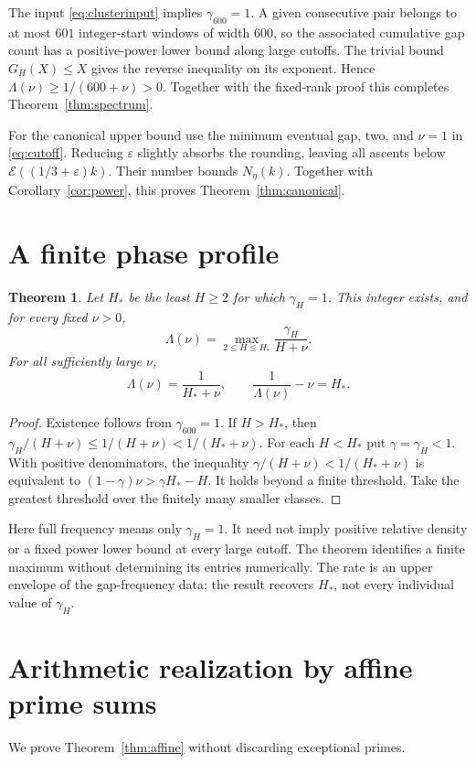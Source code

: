 \documentclass[11pt]{article}
\newtheorem{theorem}{Theorem}[section]
\theoremstyle{definition}
\newcommand{\EE}{\mathcal E}
\begin{document}
The input \eqref{eq:clusterinput} implies $\gamma_{600}=1$.
A given consecutive pair belongs to at most $601$ integer-start
windows of width $600$, so the associated cumulative gap count
has a positive-power lower bound along large cutoffs.
The trivial bound $G_H(X)\le X$ gives the reverse inequality
on its exponent. Hence $\Lambda(\nu)\ge1/(600+\nu)>0$.
Together with the fixed-rank proof this completes
Theorem~\ref{thm:spectrum}.

For the canonical upper bound use the minimum eventual gap,
two, and $\nu=1$ in \eqref{eq:cutoff}. Reducing $\varepsilon$
slightly absorbs the rounding, leaving all ascents below
$\EE((1/3+\varepsilon)k)$. Their number bounds $N_\eta(k)$.
Together with Corollary~\ref{cor:power}, this proves
Theorem~\ref{thm:canonical}.

\section{A finite phase profile}\label{sec:phase}
\begin{theorem}\label{thm:phase}
Let $H_*$ be the least $H\ge2$ for which $\gamma_H=1$.
This integer exists, and for every fixed $\nu>0$,
\[
 \Lambda(\nu)=\max_{2\le H\le H_*}\frac{\gamma_H}{H+\nu}.
\]
For all sufficiently large $\nu$,
\begin{equation}\label{eq:recovery}
 \Lambda(\nu)=\frac1{H_*+\nu},\qquad
 \frac1{\Lambda(\nu)}-\nu=H_*.
\end{equation}
\end{theorem}
\begin{proof}
Existence follows from $\gamma_{600}=1$.
If $H>H_*$, then
$\gamma_H/(H+\nu)\le1/(H+\nu)<1/(H_*+\nu)$.
For each $H<H_*$ put $\gamma=\gamma_H<1$.
With positive denominators, the inequality
$\gamma/(H+\nu)<1/(H_*+\nu)$ is equivalent to
$(1-\gamma)\nu>\gamma H_*-H$.
It holds beyond a finite threshold. Take the greatest threshold
over the finitely many smaller classes.
\end{proof}
Here full frequency means only $\gamma_H=1$. It need not imply
positive relative density or a fixed power lower bound at every
large cutoff. The theorem identifies a finite maximum without
determining its entries numerically. The rate is an upper envelope
of the gap-frequency data; the result recovers $H_*$, not every
individual value of $\gamma_H$.

\section{Arithmetic realization by affine prime sums}\label{sec:affine}
We prove Theorem~\ref{thm:affine} without discarding exceptional primes.
\end{document}
